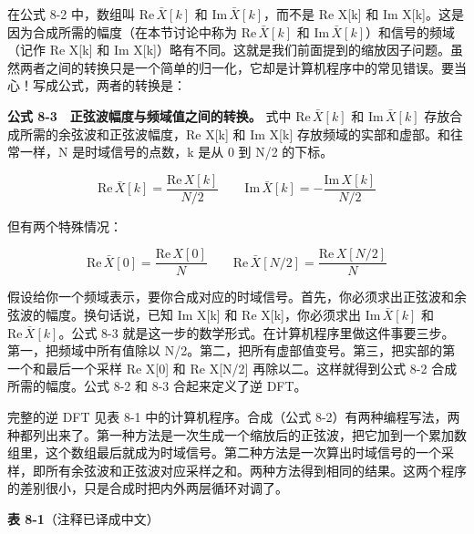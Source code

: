 在公式 8-2 中，数组叫 \(\mathrm{Re}\,\bar{X}[k]\) 和
\(\mathrm{Im}\,\bar{X}[k]\)，而不是 Re X{[}k{]} 和 Im
X{[}k{]}。这是因为合成所需的幅度（在本节讨论中称为
\(\mathrm{Re}\,\bar{X}[k]\) 和
\(\mathrm{Im}\,\bar{X}[k]\)）和信号的频域（记作 Re X{[}k{]} 和 Im
X{[}k{]}）略有不同。这就是我们前面提到的缩放因子问题。虽然两者之间的转换只是一个简单的归一化，它却是计算机程序中的常见错误。要当心！写成公式，两者的转换是：

\textbf{公式 8-3　正弦波幅度与频域值之间的转换。} 式中
\(\mathrm{Re}\,\bar{X}[k]\) 和 \(\mathrm{Im}\,\bar{X}[k]\)
存放合成所需的余弦波和正弦波幅度，Re X{[}k{]} 和 Im X{[}k{]}
存放频域的实部和虚部。和往常一样，N 是时域信号的点数，k 是从 0 到 N/2
的下标。

\[
\mathrm{Re}\,\bar{X}[k] = \frac{\mathrm{Re}\,X[k]}{N/2}
\qquad
\mathrm{Im}\,\bar{X}[k] = -\frac{\mathrm{Im}\,X[k]}{N/2}
\]

但有两个特殊情况：

\[
\mathrm{Re}\,\bar{X}[0] = \frac{\mathrm{Re}\,X[0]}{N}
\qquad
\mathrm{Re}\,\bar{X}[N/2] = \frac{\mathrm{Re}\,X[N/2]}{N}
\]

假设给你一个频域表示，要你合成对应的时域信号。首先，你必须求出正弦波和余弦波的幅度。换句话说，已知
Im X{[}k{]} 和 Re X{[}k{]}，你必须求出 \(\mathrm{Im}\,\bar{X}[k]\) 和
\(\mathrm{Re}\,\bar{X}[k]\)。公式 8-3
就是这一步的数学形式。在计算机程序里做这件事要三步。第一，把频域中所有值除以
N/2。第二，把所有虚部值变号。第三，把实部的第一个和最后一个采样 Re
X{[}0{]} 和 Re X{[}N/2{]} 再除以二。这样就得到公式 8-2
合成所需的幅度。公式 8-2 和 8-3 合起来定义了逆 DFT。

完整的逆 DFT 见表 8-1 中的计算机程序。合成（公式
8-2）有两种编程写法，两种都列出来了。第一种方法是一次生成一个缩放后的正弦波，把它加到一个累加数组里，这个数组最后就成为时域信号。第二种方法是一次算出时域信号的一个采样，即所有余弦波和正弦波对应采样之和。两种方法得到相同的结果。这两个程序的差别很小，只是合成时把内外两层循环对调了。

\textbf{表 8-1}（注释已译成中文）

